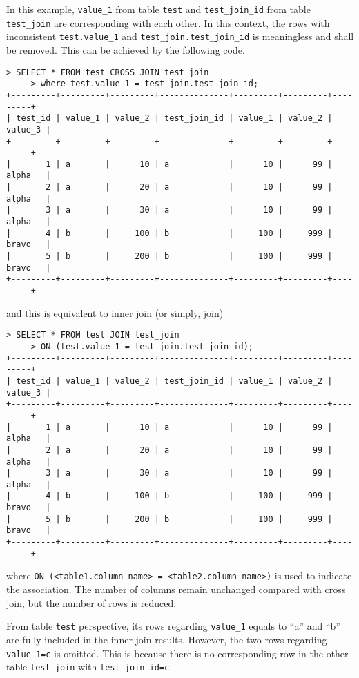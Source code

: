 In this example, \verb|value_1| from table \verb|test| and \verb|test_join_id| from table \verb|test_join| are corresponding with each other. In this context, the rows with inconsistent \verb|test.value_1| and \verb|test_join.test_join_id| is meaningless and shall be removed. This can be achieved by the following code.
\begin{lstlisting}
> SELECT * FROM test CROSS JOIN test_join
    -> where test.value_1 = test_join.test_join_id;
+---------+---------+---------+--------------+---------+---------+---------+
| test_id | value_1 | value_2 | test_join_id | value_1 | value_2 | value_3 |
+---------+---------+---------+--------------+---------+---------+---------+
|       1 | a       |      10 | a            |      10 |      99 | alpha   |
|       2 | a       |      20 | a            |      10 |      99 | alpha   |
|       3 | a       |      30 | a            |      10 |      99 | alpha   |
|       4 | b       |     100 | b            |     100 |     999 | bravo   |
|       5 | b       |     200 | b            |     100 |     999 | bravo   |
+---------+---------+---------+--------------+---------+---------+---------+
\end{lstlisting}
and this is equivalent to inner join (or simply, join)
\begin{lstlisting}
> SELECT * FROM test JOIN test_join
    -> ON (test.value_1 = test_join.test_join_id);
+---------+---------+---------+--------------+---------+---------+---------+
| test_id | value_1 | value_2 | test_join_id | value_1 | value_2 | value_3 |
+---------+---------+---------+--------------+---------+---------+---------+
|       1 | a       |      10 | a            |      10 |      99 | alpha   |
|       2 | a       |      20 | a            |      10 |      99 | alpha   |
|       3 | a       |      30 | a            |      10 |      99 | alpha   |
|       4 | b       |     100 | b            |     100 |     999 | bravo   |
|       5 | b       |     200 | b            |     100 |     999 | bravo   |
+---------+---------+---------+--------------+---------+---------+---------+
\end{lstlisting}
where \verb|ON (<table1.column-name> = <table2.column_name>)| is used to indicate the association. The number of columns remain unchanged compared with cross join, but the number of rows is reduced.

From table \verb|test| perspective, its rows regarding \verb|value_1| equals to ``a'' and ``b'' are fully included in the inner join results. However, the two rows regarding \verb|value_1=c| is omitted. This is because there is no corresponding row in the other table \verb|test_join| with \verb|test_join_id=c|.

